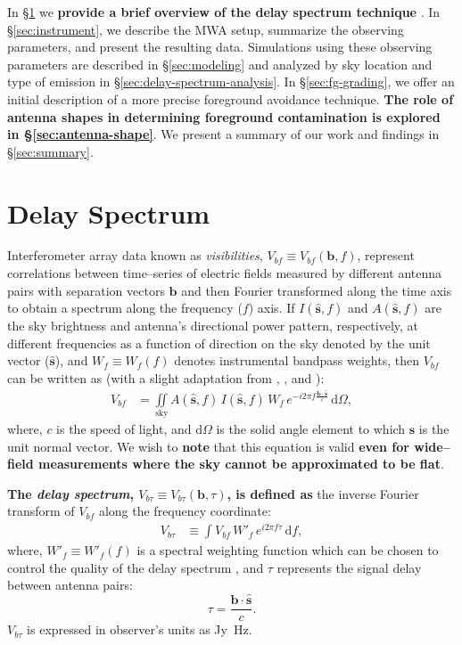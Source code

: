 \documentclass[preprint2,iop,numberedappendix]{emulateapj}
\newcommand{\dif}{\mathrm{d}}
\begin{document}
In \S\ref{sec:delay-spectrum} we {\bf provide a brief overview of the delay spectrum technique} \citep{par12a,par12b}. In \S\ref{sec:instrument}, we describe the MWA setup, summarize the observing parameters, and present the resulting data. Simulations using these observing parameters are described in \S\ref{sec:modeling} and analyzed by sky location and type of emission in \S\ref{sec:delay-spectrum-analysis}. In \S\ref{sec:fg-grading}, we offer an initial description of a more precise foreground avoidance technique. {\bf The role of antenna shapes in determining foreground contamination is explored in \S\ref{sec:antenna-shape}}. We present a summary of our work and findings in \S\ref{sec:summary}.

\section{Delay Spectrum}\label{sec:delay-spectrum}

Interferometer array data known as {\it visibilities}, $V_{bf}\equiv V_{bf}(\boldsymbol{b},f)$, represent correlations between time--series of electric fields measured by different antenna pairs with separation vectors $\boldsymbol{b}$ and then Fourier transformed along the time axis to obtain a spectrum along the frequency ($f$) axis. If $I(\hat{\boldsymbol{s}},f)$ and $A(\hat{\boldsymbol{s}},f)$ are the sky brightness and antenna's directional power pattern, respectively, at different frequencies as a function of direction on the sky denoted by the unit vector ($\hat{\boldsymbol{s}}$), and $W_f\equiv W_f(f)$ denotes instrumental bandpass weights, then $V_{bf}$ can be written as (with a slight adaptation from \citet{van34}, \citet{zer38}, and \citet{tho01}):
\begin{align}\label{eqn:obsvis}
  V_{bf} &= \iint\limits_\textrm{sky} A(\hat{\boldsymbol{s}},f)\,I(\hat{\boldsymbol{s}},f)\,W_f\,e^{-i2\pi f\frac{\boldsymbol{b}\cdot\hat{\boldsymbol{s}}}{c}}\,\dif\Omega,
\end{align}
where, $c$ is the speed of light, and $\dif\Omega$ is the solid angle element to which $\hat{\boldsymbol{s}}$ is the unit normal vector. We wish to {\bf note} that this equation is valid {\bf even for wide--field measurements where the sky cannot be approximated to be flat}.

{\bf The {\it delay spectrum}, $V_{b\tau}\equiv V_{b\tau}(\boldsymbol{b},\tau)$, is defined as} the inverse Fourier transform of $V_{bf}$ along the frequency coordinate:
\begin{align}\label{eqn:delay-transform}
  V_{b\tau} &\equiv \int V_{bf}\,W'_f\,e^{i2\pi f\tau}\,\dif f,
\end{align}
where, $W'_f\equiv W'_f(f)$ is a spectral weighting function which can be chosen to control the quality of the delay spectrum \citep{thy13,ved12}, and $\tau$ represents the signal delay between antenna pairs:
\begin{equation}\label{eqn:delay}
  \tau = \frac{\boldsymbol{b}\cdot\hat{\boldsymbol{s}}}{c}.
\end{equation}
$V_{b\tau}$ is expressed in observer's units as Jy~Hz.
\end{document}
